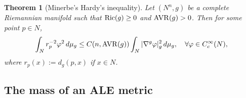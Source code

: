 \documentclass[a4paper,11pt,reqno]{amsart}
\newtheorem{theo}[defn]{Theorem}
\def\Ric{\mathop{\rm Ric}\nolimits}
\def\AVR{\mathop{\rm AVR}\nolimits}
\def\Ric{\mathop{\rm Ric}\nolimits}
\def\AVR{\mathop{\rm AVR}\nolimits}
\numberwithin{equation}{section}
\begin{document}
	\begin{theo}[Minerbe's Hardy's inequality]\label{thm-min-har-inequ}
		Let $(N^n,g)$ be a complete Riemannian manifold such that $\Ric(g)\geq 0$ and $\AVR(g)>0$. Then for some point $p\in N$,
		\begin{equation*}
		\int_Nr_p^{-2}\varphi^2\,d\mu_g\leq C(n,\AVR(g))\int_N|\nabla^{g}\varphi|_{g}^2\,d\mu_{g},\quad \forall \varphi\in C_c^{\infty}(N),
		\end{equation*}
		where $r_p(x):=d_g(p,x)$ if $x\in N$.
	\end{theo}
	
	\subsection{The mass of an ALE metric}\label{sec-mass-def}~~\\
	
\end{document}
